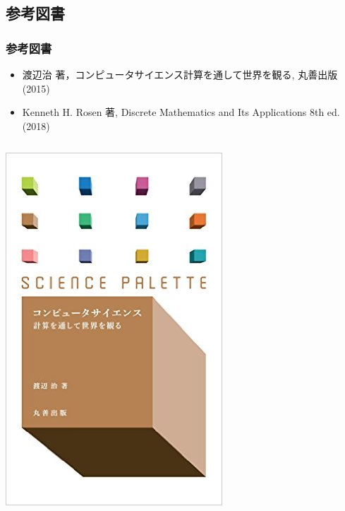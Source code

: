 \subsection{参考図書}
\begin{frame}
\frametitle{参考図書}
  \begin{itemize}
\item 渡辺治 著，コンピュータサイエンス\textendash 計算を通して世界を観る, 丸善出版 (2015)
\item Kenneth H. Rosen 著, Discrete Mathematics and Its Applications 8th ed.(2018)
  \end{itemize}
  \begin{columns}[t]
    \begin{column}{0.45\textwidth}
\centering
\includegraphics[scale=.25]{./Figure/TextBook.jpg}
    \end{column}
    \begin{column}{0.45\textwidth}
\centering

\end{column}
\end{columns}
\end{frame}
